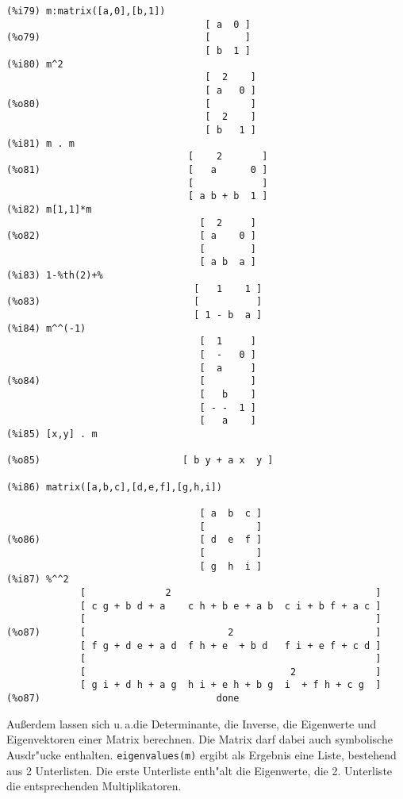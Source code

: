 \documentclass[ngerman,12pt,a4paper]{article}
\begin{document}
\scriptsize
\begin{verbatim}
(%i79) m:matrix([a,0],[b,1])
                                   [ a  0 ]
(%o79)                             [      ]
                                   [ b  1 ]
(%i80) m^2
                                   [  2    ]
                                   [ a   0 ]
(%o80)                             [       ]
                                   [  2    ]
                                   [ b   1 ]
(%i81) m . m
                                [    2       ]
(%o81)                          [   a      0 ]
                                [            ]
                                [ a b + b  1 ]
(%i82) m[1,1]*m
                                  [  2     ]
(%o82)                            [ a    0 ]
                                  [        ]
                                  [ a b  a ]
(%i83) 1-%th(2)+%
                                 [   1    1 ]
(%o83)                           [          ]
                                 [ 1 - b  a ]
(%i84) m^^(-1)
                                  [  1     ]
                                  [  -   0 ]
                                  [  a     ]
(%o84)                            [        ]
                                  [   b    ]
                                  [ - -  1 ]
                                  [   a    ]
(%i85) [x,y] . m

(%o85)                         [ b y + a x  y ]

(%i86) matrix([a,b,c],[d,e,f],[g,h,i])

                                  [ a  b  c ]
                                  [         ]
(%o86)                            [ d  e  f ]
                                  [         ]
                                  [ g  h  i ]
(%i87) %^^2
             [              2                                    ]
             [ c g + b d + a    c h + b e + a b  c i + b f + a c ]
             [                                                   ]
(%o87)       [                         2                         ]
             [ f g + d e + a d  f h + e  + b d   f i + e f + c d ]
             [                                                   ]
             [                                    2              ]
             [ g i + d h + a g  h i + e h + b g  i  + f h + c g  ]
(%o87)                               done
\end{verbatim}
\normalsize

Au{\ss}erdem lassen sich u.\,a.\@ die Determinante, die Inverse, die Eigenwerte und Eigenvektoren einer Matrix berechnen. Die Matrix darf dabei auch symbolische Ausdr"ucke enthalten.
\verb|eigenvalues(m)| ergibt als Ergebnis eine Liste, bestehend aus 2 Unterlisten. Die erste Unterliste enth"alt die Eigenwerte, die 2. Unterliste die entsprechenden Multiplikatoren.
\end{document}
